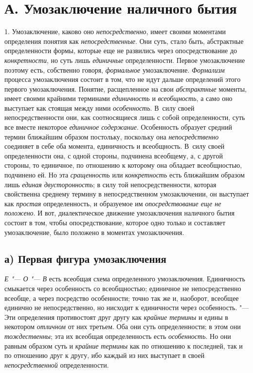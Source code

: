 \section[А. Умозаключение наличного бытия]{А. Умозаключение наличного бытия}
1. Умозаключение, каково оно
{\em непосредственно},
имеет своими моментами определения понятия как
{\em непосредственные}.
Они суть, стало быть, абстрактные определенности формы,
которые еще не развились через опосредствование до
{\em конкретности}, но
суть лишь {\em единичные}
определенности. Первое умозаключение поэтому есть,
собственно говоря,
{\em формальное}
умозаключение.
{\em Формализм} процесса
умозаключения состоит в том, что не идут дальше определений этого первого
умозаключения. Понятие, расщепленное на свои
{\em абстрактные}
моменты, имеет своими крайними терминами
{\em единичность} и
{\em всеобщность}, а само
оно выступает как стоящая между ними
{\em особенность}. В~силу
своей непосредственности они, как соотносящиеся лишь с собой
определенности, суть все вместе некоторое
{\em единичное содержание}.
Особенность образует средний термин ближайшим образом
постольку, поскольку она
{\em непосредственно}
соединяет в себе оба момента, единичность и всеобщность. В~силу своей
определенности она, с одной стороны, подчинена всеобщему, а, с
другой стороны, то единичное, по отношению к которому она обладает
всеобщностью, подчинено ей. Но эта {\em сращенность} или
{\em конкретность}
есть ближайшим образом лишь
{\em единая двусторонность};
в силу той непосредственности, которая свойственна среднему
термину в непосредственном умозаключении, он выступает как
{\em простая}
определенность, и образуемое им
{\em опосредствование еще не положено}.
И вот, диалектическое движение умозаключения наличного бытия
состоит в том, чтобы опосредствование, которое одно только и составляет
умозаключение, было положено в моментах умозаключения.

\subsection[а) Первая фигура умозаключения]{а) Первая фигура умозаключения}
{\em Е "--- О "--- В}
есть всеобщая схема определенного умозаключения. Единичность
смыкается через особенность со всеобщностью; единичное не непосредственно
всеобще, а через посредство особенности; точно так же и, наоборот, всеобщее
единично не непосредственно, но нисходит к единичности через особенность.
"--- Эти определения противостоят друг другу как
{\em крайние термины} и
едины в некотором {\em отличном}
от них третьем. Оба они суть определенности; в этом они
{\em тождественны}; эта
их всеобщая определенность есть
{\em особенность}. Но они
равным образом суть и {\em крайние
термины} как по отношению к последней, так и по отношению
друг к другу, ибо каждый из них выступает в своей
{\em непосредственной}
определенности.


